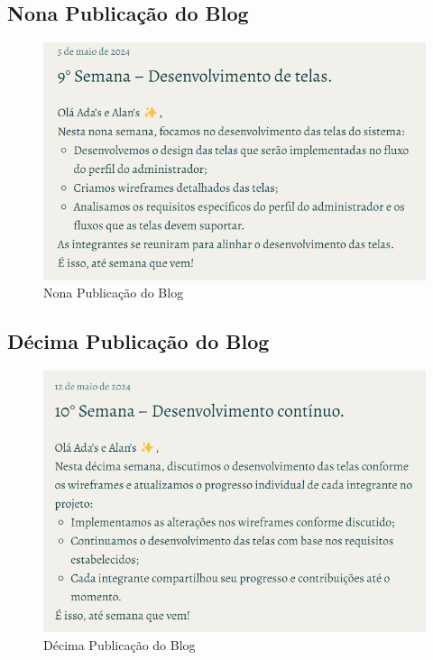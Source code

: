 \begin{apendicesenv}
\subsection*{Nona Publicação do Blog}
\begin{figure}[H]
    \centering
    \includegraphics[width=1.0\linewidth]{images/Post9.png}
    \caption{Nona Publicação do Blog}
    \label{fig:nona}
\end{figure}

\subsection*{Décima Publicação do Blog}
\begin{figure}[H]
    \centering
    \includegraphics[width=1.0\linewidth]{images/Post10.png}
    \caption{Décima Publicação do Blog}
    \label{fig:decima}
\end{figure}


\end{apendicesenv}
